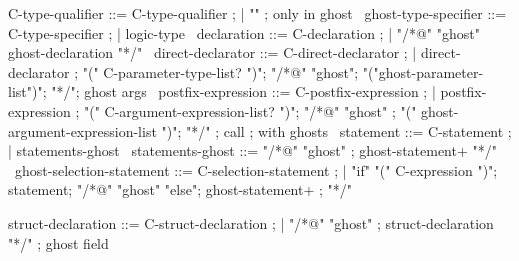 \begin{syntax}

  C-type-qualifier ::= C-type-qualifier ;
  | { "\ghost" } ; only in ghost
  \
  ghost-type-specifier ::= C-type-specifier ;
  | { logic-type } \
  declaration ::= C-declaration ;
  | "/*@" "ghost" ghost-declaration "*/" \
  direct-declarator ::= C-direct-declarator ;
    | direct-declarator ;
    "(" C-parameter-type-list? ")";
        {"/*@" "ghost"};
          {"("ghost-parameter-list")"};
          {"*/"}; ghost args
        \
  postfix-expression ::= C-postfix-expression ;
    | postfix-expression ;
     "(" C-argument-expression-list? ")";
     {"/*@" "ghost"} ;
     {  "(" ghost-argument-expression-list ")"};
     {  "*/"} ; call
              ; with ghosts
    \
  statement ::= C-statement ;
             | statements-ghost \
  statements-ghost ::= "/*@" "ghost" ;
                       ghost-statement+ "*/" \
  ghost-selection-statement ::= C-selection-statement ;
    | "if" "(" C-expression ")";
       statement;
      {"/*@" "ghost" "else"};
      {  ghost-statement+ };
      {  "*/"} \

  struct-declaration ::= C-struct-declaration ;
  | {"/*@" "ghost" };
    {struct-declaration "*/"} ; ghost field

\end{syntax}
